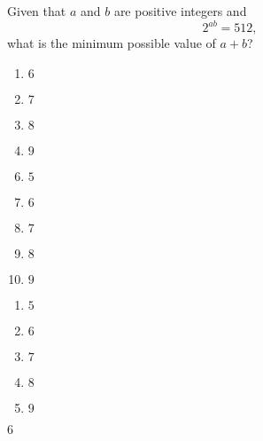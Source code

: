 


  Given that $a$ and $b$ are positive integers and \[2^{ab}=512,\]what is the minimum possible value of $a+b$?


\ifsat
	\begin{enumerate}[label=\Alph*)]
		\item  $6$%
		\item  $7$
		\item  $8$
		\item   $9$
	\end{enumerate}
\else
\fi

\ifacteven
	\begin{enumerate}[label=\textbf{\Alph*.},itemsep=\fill,align=left]
		\setcounter{enumii}{5}
		\item   $5$
		\item  $6$%
		\item  $7$
		\addtocounter{enumii}{1}
		\item  $8$
		\item   $9$
	\end{enumerate}
\else
\fi

\ifactodd
	\begin{enumerate}[label=\textbf{\Alph*.},itemsep=\fill,align=left]
		\item   $5$
		\item  $6$%
		\item  $7$
		\item  $8$
		\item   $9$
	\end{enumerate}
\else
\fi

\ifgridin
  $6$%
		
\else
\fi

